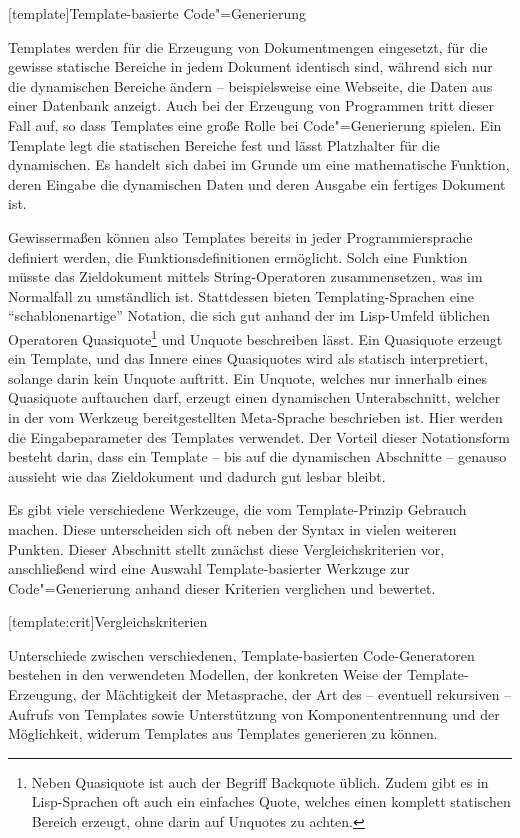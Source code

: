 \documentclass[11pt, a4paper, bibgerm]{scrbook}
\newcommand\lchapter{}
\newcommand\lsection{}
\newcommand{\cgen}{Code"=Generierung}
\begin{document}
\lchapter[template]{Template-basierte \cgen{}}

Templates werden für die Erzeugung von Dokumentmengen eingesetzt, für
die gewisse statische Bereiche in jedem Dokument identisch sind, während
sich nur die dynamischen Bereiche ändern -- beispielsweise eine Webseite,
die Daten aus einer Datenbank anzeigt. Auch bei der Erzeugung von
Programmen tritt dieser Fall auf, so dass Templates eine große Rolle bei
\cgen{} spielen. Ein Template legt die statischen Bereiche fest und lässt
Platzhalter für die dynamischen. Es handelt sich dabei im Grunde um eine
mathematische Funktion, deren Eingabe die dynamischen Daten und deren
Ausgabe ein fertiges Dokument ist.

Gewissermaßen können also Templates bereits in jeder Programmiersprache
definiert werden, die Funktionsdefinitionen ermöglicht. Solch eine
Funktion müsste das Zieldokument mittels String-Operatoren
zusammensetzen, was im Normalfall zu umständlich ist. Stattdessen bieten
Templating-Sprachen eine ``schablonenartige'' Notation, die sich gut
anhand der im Lisp-Umfeld üblichen Operatoren Quasiquote\footnote{Neben
  Quasiquote ist auch der Begriff Backquote üblich. Zudem
  gibt es in Lisp-Sprachen oft auch ein einfaches Quote, welches einen
  komplett statischen Bereich erzeugt, ohne darin auf Unquotes zu
  achten.} und Unquote beschreiben lässt. Ein Quasiquote erzeugt ein
Template, und das Innere eines Quasiquotes wird als statisch
interpretiert, solange darin kein Unquote auftritt. Ein Unquote, welches
nur innerhalb eines Quasiquote auftauchen darf, erzeugt einen
dynamischen Unterabschnitt, welcher in der vom Werkzeug bereitgestellten
Meta-Sprache beschrieben ist. Hier werden die Eingabeparameter des
Templates verwendet. Der Vorteil dieser Notationsform besteht darin,
dass ein Template -- bis auf die dynamischen Abschnitte -- genauso
aussieht wie das Zieldokument und dadurch gut lesbar bleibt.

Es gibt viele verschiedene Werkzeuge, die vom Template-Prinzip Gebrauch
machen. Diese unterscheiden sich oft neben der Syntax in vielen weiteren
Punkten. Dieser Abschnitt stellt zunächst diese Vergleichskriterien vor,
anschließend wird eine Auswahl Template-basierter Werkzuge zur \cgen{}
anhand dieser Kriterien verglichen und bewertet.

\lsection[template:crit]{Vergleichskriterien}

Unterschiede zwischen verschiedenen, Template-basierten Code-Generatoren
bestehen in den verwendeten Modellen, der konkreten Weise der
Template-Erzeugung, der Mächtigkeit der Metasprache, der Art des --
eventuell rekursiven -- Aufrufs von Templates sowie Unterstützung von
Komponententrennung und der Möglichkeit, widerum Templates aus Templates
generieren zu können.  
\end{document}
